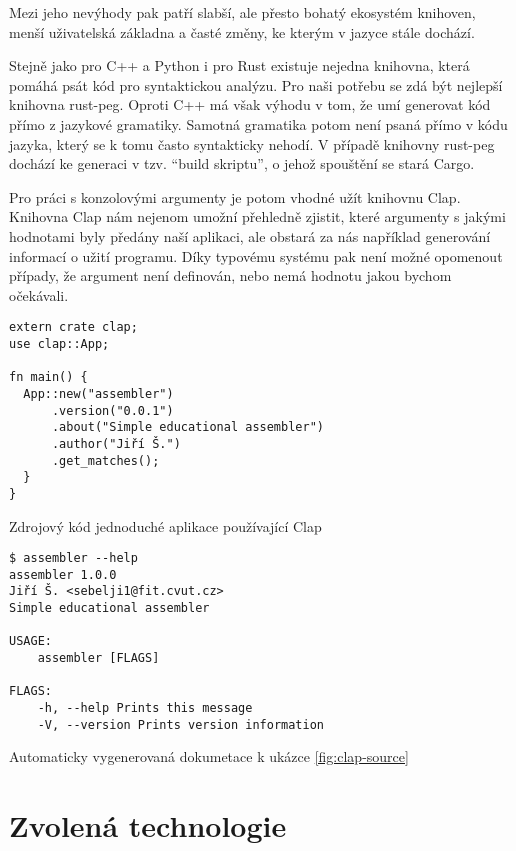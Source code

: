 Mezi jeho nevýhody pak patří slabší, ale přesto bohatý ekosystém knihoven, menší uživatelská základna\cite{so-survey-2018} a časté změny, ke kterým v jazyce stále dochází.

Stejně jako pro C++ a Python i pro Rust existuje nejedna knihovna, která pomáhá psát kód pro syntaktickou analýzu. Pro naši potřebu se zdá být nejlepší knihovna rust-peg\cite{github-rust-peg}. Oproti C++ má však výhodu v tom, že umí generovat kód přímo z jazykové gramatiky. Samotná gramatika potom není psaná přímo v kódu jazyka, který se k tomu často syntakticky nehodí. V případě knihovny rust-peg dochází ke generaci v tzv. ``build skriptu'', o jehož spouštění se stará Cargo.

Pro práci s konzolovými argumenty je potom vhodné užít knihovnu Clap\cite{github-clap}. Knihovna Clap nám nejenom umožní přehledně zjistit, které argumenty s jakými hodnotami byly předány naší aplikaci, ale obstará za nás například generování informací o užití programu. Díky typovému systému pak není možné opomenout případy, že argument není definován, nebo nemá hodnotu jakou bychom očekávali.

\begin{listing}
\begin{verbatim}
extern crate clap;
use clap::App;
 
fn main() {
  App::new("assembler")
      .version("0.0.1")
      .about("Simple educational assembler")
      .author("Jiří Š.")
      .get_matches();
  }
}
\end{verbatim}
\caption{Zdrojový kód jednoduché aplikace používající Clap}
\label{fig:clap-source}
\end{listing}

\begin{listing}
\begin{verbatim}
$ assembler --help
assembler 1.0.0
Jiří Š. <sebelji1@fit.cvut.cz>
Simple educational assembler

USAGE:
    assembler [FLAGS]

FLAGS:
    -h, --help Prints this message
    -V, --version Prints version information
\end{verbatim}
\caption{Automaticky vygenerovaná dokumetace k ukázce \ref{fig:clap-source}}
\label{fig:clap-output}
\end{listing}

\section{Zvolená technologie}

